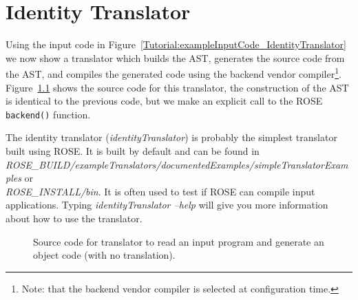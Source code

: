 \chapter{Identity Translator}

  Using the input code in Figure~\ref{Tutorial:exampleInputCode_IdentityTranslator}
we now show a translator which builds the AST, generates the source code from the AST, 
and compiles the generated code using the backend vendor compiler\footnote{
Note: that the backend vendor compiler is selected at configuration time.}.
Figure~\ref{Tutorial:exampleIdentityTranslator} shows the source code for this
translator, the construction of the AST is identical to the previous code, but
we make an explicit call to the ROSE {\tt backend()} function.

The identity translator (\textit{identityTranslator}) is probably the
simplest translator built using ROSE. It is built by default and can be found in \\
\textit{ROSE\_BUILD/exampleTranslators/documentedExamples/simpleTranslatorExamples} 
or \\
\textit{ROSE\_INSTALL/bin}.  It is often used to test if
ROSE can compile input applications.
Typing \textit{identityTranslator --help} will give you more information
about how to use the translator.

\begin{figure}[!h]
{\indent
{\mySmallFontSize


\begin{latexonly}
   
\end{latexonly}

\begin{htmlonly}
   
\end{htmlonly}

}
}
\caption{Source code for translator to read an input program 
         and generate an object code (with no translation).}
\label{Tutorial:exampleIdentityTranslator}
\end{figure}

